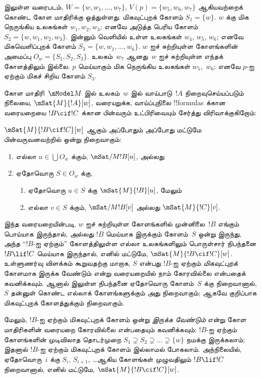 \documentclass[../../../include/open-logic-section]{subfiles}
\begin{document}
 இலுள்ள வரைபடம், $W = \{w, w_1, \dots,
w_7\}$, $V(p) = \{w_5, w_6, w_7\}$ ஆகியவற்றைக் கொண்ட கோள மாதிரிக்கு
ஒத்துள்ளது. மிகவுட்புறக் கோளம் $S_1 = \{w\}$. $w$ க்கு மிக நெருங்கிய
உலகங்கள் $w_1, w_2, w_3$; எனவே அடுத்த பெரிய கோளம் $S_2 = \{w,
w_1, w_2, w_3\}$. இன்னும் வெளியில் உள்ள உலகங்கள் $w_4$, $w_5$, $w_6$;
எனவே மிகவெளிப்புறக் கோளம் $S_3 = \{w, w_1, \dots, w_6\}$. $w$ ஐச்
சுற்றியுள்ள கோளங்களின் அமைப்பு $O_w = \{S_1, S_2, S_3\}$. உலகம்~$w_7$
ஆனது~$w$ ஐச் சுற்றியுள்ள எந்தக் கோளத்திலும் இல்லை. $p$ மெய்யாகும் மிக
நெருங்கிய உலகங்கள் $w_5$,~$w_6$; எனவே $p$-ஐ ஏற்கும் மிகச் சிறிய கோளம்
$S_3$.

கோள மாதிரி~$\mModel M$ இல் உலகம்~$w$ இல் வாய்பாடு~$!A$ நிறைவுசெய்யப்படும்
நிலையை, $\mSat{M}{!A}[w]$, வரையறுக்க, வாய்ப்புநிலை !!{formula}s க்கான
வரையறையை $!B \cif !C$ க்கான பின்வரும் உட்பிரிவையும் சேர்த்து
விரிவாக்குகிறோம்:

\begin{defn}
  $\mSat{M}{!B \cif !C}[w]$ ஆகும் அப்போதும் அப்போது மட்டுமே பின்வருவனவற்றில்
  ஒன்று நிறைவாகும்:
  \begin{enumerate}
  \item{} எல்லா $u \in \bigcup O_w$ க்கும்,
    $\mSat/{M}{!B}[u]$, அல்லது
  \item{} ஏதோவொரு $S \in O_w$ க்கு,
    \begin{enumerate}
      \item ஏதோவொரு $u \in S$ க்கு $\mSat{M}{!B}[u]$, மேலும்
      \item எல்லா $v \in S$ க்கும், $\mSat/{M}{!B}[v]$ அல்லது
        $\mSat{M}{!C}[v]$.
    \end{enumerate}
  \end{enumerate}
\end{defn}

இந்த வரையறையின்படி, $w$ ஐச் சுற்றியுள்ள கோளங்களில் முன்னிலை~$!B$
எங்கும் பொய்யாக இருந்தால், அல்லது $!B$ மெய்யாக இருக்கும் கோளம்~$S$
ஒன்று இருந்து, அந்த ``$!B$-ஐ ஏற்கும்'' கோளத்திலுள்ள எல்லா உலகங்களிலும்
பொருள்சார் நிபந்தனை $!B \lif !C$ மெய்யாக இருந்தால், எனில் மட்டுமே,
$\mSat{M}{!B \cif !C}[w]$. உள்ளுணர்வு விளக்கம் கூறுவதற்கு மாறாக,
$S$ என்பது $!B$-ஐ ஏற்கும் \emph{மிகவுட்புறக்} கோளமாக இருக்க வேண்டும்
என்று வரையறையில் நாம் கோரவில்லை என்பதைக் கவனிக்கவும். ஆனால்
 இலுள்ள நிபந்தனை ஏதோவொரு கோளம்~$S$ க்கு
நிறைவானால், $S$ தன்னுள் கொண்ட எல்லாக் கோளங்களுக்கும்
அது நிறைவாகும்; ஆகவே குறிப்பாக மிகவுட்புறக் கோளத்துக்கும் நிறைவாகும்.

மேலும், $!B$-ஐ ஏற்கும் மிகவுட்புறக் கோளம் ஒன்று \emph{இருக்க வேண்டும்}
என்று கோள மாதிரிகளின் வரையறை கோரவில்லை என்பதையும் கவனிக்கவும்: $!B$-ஐ
ஏற்கும் கோளங்களின் முடிவிலாத தொடர்முறை $S_1 \supsetneq S_2 \supsetneq
\dots \supsetneq \{w\}$ நமக்கு இருக்கலாம்; இதனால் $!B$-ஐ ஏற்கும்
மிகவுட்புறக் கோளம் இல்லாமல் போகலாம். அந்நிலையில், ஏதோவொரு~$i$ க்கு
$S_i$, $S_{i+1}$, \dots ஆகிய கோளங்கள் முழுவதிலும் $!B \lif !C$
நிறைவானால், எனில் மட்டுமே, $\mSat{M}{!B \cif !C}[w]$.
\end{document}
